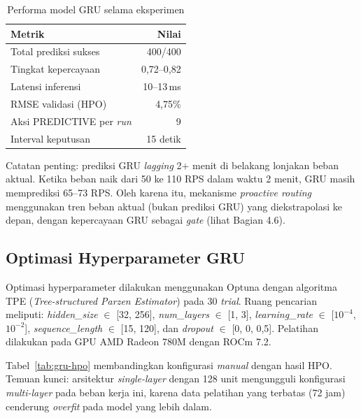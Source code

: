 \begin{table}[htbp]
    \centering
    \caption{Performa model GRU selama eksperimen}
    \label{tab:gru-performance}
    \begin{tabular}{lr}
        \toprule
        Metrik & Nilai \\
        \midrule
        Total prediksi sukses & 400/400 \\
        Tingkat kepercayaan & 0,72--0,82 \\
        Latensi inferensi & 10--13\,ms \\
        RMSE validasi (HPO) & 4,75\% \\
        Aksi PREDICTIVE per \emph{run} & 9 \\
        Interval keputusan & 15 detik \\
        \bottomrule
    \end{tabular}
\end{table}

Catatan penting: prediksi GRU \emph{lagging} 2+ menit di belakang lonjakan beban aktual. Ketika beban naik dari 50 ke 110 RPS dalam waktu 2 menit, GRU masih memprediksi 65--73 RPS. Oleh karena itu, mekanisme \emph{proactive routing} menggunakan tren beban aktual (bukan prediksi GRU) yang diekstrapolasi ke depan, dengan kepercayaan GRU sebagai \emph{gate} (lihat Bagian 4.6).

\subsection{Optimasi Hyperparameter GRU}
\label{sec:gru-hpo}

Optimasi hyperparameter dilakukan menggunakan Optuna dengan algoritma TPE (\emph{Tree-structured Parzen Estimator}) pada 30 \emph{trial}. Ruang pencarian meliputi: \emph{hidden\_size} $\in$ [32, 256], \emph{num\_layers} $\in$ [1, 3], \emph{learning\_rate} $\in$ [$10^{-4}$, $10^{-2}$], \emph{sequence\_length} $\in$ [15, 120], dan \emph{dropout} $\in$ [0, 0, 0,5]. Pelatihan dilakukan pada GPU AMD Radeon 780M dengan ROCm 7.2.

Tabel~\ref{tab:gru-hpo} membandingkan konfigurasi \emph{manual} dengan hasil HPO. Temuan kunci: arsitektur \emph{single-layer} dengan 128 unit mengungguli konfigurasi \emph{multi-layer} pada beban kerja ini, karena data pelatihan yang terbatas (72 jam) cenderung \emph{overfit} pada model yang lebih dalam.


